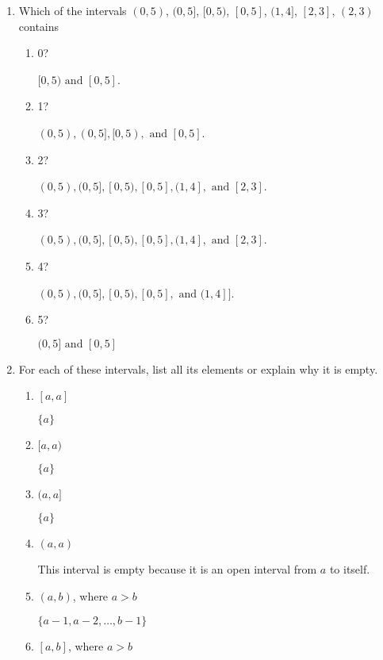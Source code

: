 \documentclass[11pt]{article}
\begin{document}
\begin{enumerate}[label=\textbf{\arabic*.}]
	\item Which of the intervals $(0, 5)$, $(0, 5]$, $[0, 5)$, $[0, 5]$, $(1, 4]$, $[2, 3]$, $(2, 3)$ contains
	
	\begin{enumerate}[label=\textbf{\alph*)}]
		\item 0?
		
		$[0, 5) \text{ and } [0, 5]$.
		
		\item 1?
		
		$(0, 5), (0, 5], [0, 5), \text{ and } [0, 5]$.
		
		\item 2?
		
		$(0, 5), (0, 5], [0, 5), [0, 5], (1, 4], \text{ and } [2, 3]$.
		
		\item 3?
		
		$(0, 5), (0, 5], [0, 5), [0, 5], (1, 4], \text{ and } [2, 3]$.
		
		\item 4?
		
		$(0, 5), (0, 5], [0, 5), [0, 5], \text{ and } (1, 4]]$.
		
		\item 5?
		
		$(0, 5] \text{ and } [0, 5]$
	\end{enumerate}

	\pagebreak
	\item For each of these intervals, list all its elements or explain why it is empty.
	
	\begin{enumerate}[label=\textbf{\alph*)}]
		\item $[a, a]$
		
		$\{a\}$
		
		\item $[a, a)$
		
		$\{a\}$
		
		\item $(a, a]$
		
		$\{a\}$
		
		\item $(a, a)$
		
		This interval is empty because it is an open interval from $a$ to itself.
		
		\item $(a, b)$, where $a > b$
		
		$\{a - 1, a - 2, \ldots, b - 1\}$
		
		\item $[a, b]$, where $a > b$
		

\end{enumerate}
\end{enumerate}
\end{document}
